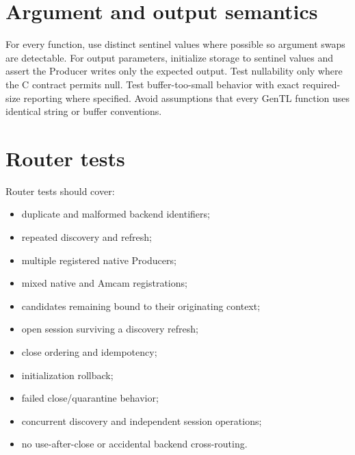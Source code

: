 \documentclass[11pt,a4paper]{report}
\begin{document}
\section{Argument and output semantics}
For every function, use distinct sentinel values where possible so argument swaps are detectable. For output parameters, initialize storage to sentinel values and assert the Producer writes only the expected output. Test nullability only where the C contract permits null. Test buffer-too-small behavior with exact required-size reporting where specified. Avoid assumptions that every GenTL function uses identical string or buffer conventions.

\section{Router tests}
Router tests should cover:
\begin{itemize}
  \item duplicate and malformed backend identifiers;
  \item repeated discovery and refresh;
  \item multiple registered native Producers;
  \item mixed native and Amcam registrations;
  \item candidates remaining bound to their originating context;
  \item open session surviving a discovery refresh;
  \item close ordering and idempotency;
  \item initialization rollback;
  \item failed close/quarantine behavior;
  \item concurrent discovery and independent session operations;
  \item no use-after-close or accidental backend cross-routing.
\end{itemize}
\end{document}
